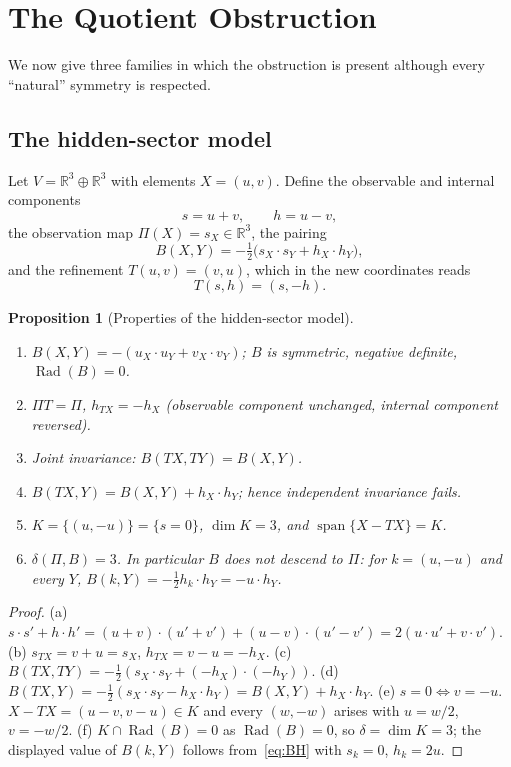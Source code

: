 \documentclass[11pt,a4paper]{article}
\newcommand{\RR}{\mathbb{R}}
\newcommand{\Rad}{\operatorname{Rad}}
\newcommand{\spn}{\operatorname{span}}
\newcommand{\defic}{\delta}
\theoremstyle{plain}
\newtheorem{proposition}[theorem]{Proposition}
\theoremstyle{definition}
\begin{document}
\section{The Quotient Obstruction}\label{sec:obstruction}
We now give three families in which the obstruction is present although every ``natural'' symmetry is respected.

\subsection{The hidden-sector model}\label{sec:modelH}
Let $V=\RR^3\oplus\RR^3$ with elements $X=(u,v)$. Define the observable and internal components
\[ s=u+v,\qquad h=u-v, \]
the observation map $\Pi(X)=s_X\in\RR^3$, the pairing
\begin{equation}\label{eq:BH}
B(X,Y)=-\tfrac12\bigl(s_X\!\cdot s_Y+h_X\!\cdot h_Y\bigr),
\end{equation}
and the refinement $T(u,v)=(v,u)$, which in the new coordinates reads
\begin{equation}\label{eq:Th}
T(s,h)=(s,-h).
\end{equation}
\begin{proposition}[Properties of the hidden-sector model]\label{prop:H}
\begin{enumerate}[label=(\alph*)]
\item $B(X,Y)=-(u_X\!\cdot u_Y+v_X\!\cdot v_Y)$; $B$ is symmetric, negative definite, $\Rad(B)=0$.
\item $\Pi T=\Pi$, $h_{TX}=-h_X$ (observable component unchanged, internal component reversed).
\item Joint invariance: $B(TX,TY)=B(X,Y)$.
\item $B(TX,Y)=B(X,Y)+h_X\!\cdot h_Y$; hence independent invariance fails.
\item $K=\{(u,-u)\}=\{s=0\}$, $\dim K=3$, and $\spn\{X-TX\}=K$.
\item $\defic(\Pi,B)=3$. In particular $B$ does \emph{not} descend to $\Pi$: for $k=(u,-u)$ and every $Y$, $B(k,Y)=-\tfrac12h_k\!\cdot h_Y=-u\!\cdot h_Y$.
\end{enumerate}
\end{proposition}
\begin{proof}
(a) $s\!\cdot\!s'+h\!\cdot\!h'=(u{+}v)\!\cdot\!(u'{+}v')+(u{-}v)\!\cdot\!(u'{-}v')=2(u\!\cdot\!u'+v\!\cdot\!v')$.
(b) $s_{TX}=v+u=s_X$, $h_{TX}=v-u=-h_X$.
(c) $B(TX,TY)=-\tfrac12(s_X\!\cdot s_Y+(-h_X)\!\cdot(-h_Y))$.
(d) $B(TX,Y)=-\tfrac12(s_X\!\cdot s_Y-h_X\!\cdot h_Y)=B(X,Y)+h_X\!\cdot h_Y$.
(e) $s=0\iff v=-u$. $X-TX=(u-v,v-u)\in K$ and every $(w,-w)$ arises with $u=w/2$, $v=-w/2$.
(f) $K\cap\Rad(B)=0$ as $\Rad(B)=0$, so $\defic=\dim K=3$; the displayed value of $B(k,Y)$ follows from~\eqref{eq:BH} with $s_k=0$, $h_k=2u$.
\end{proof}
\end{document}
